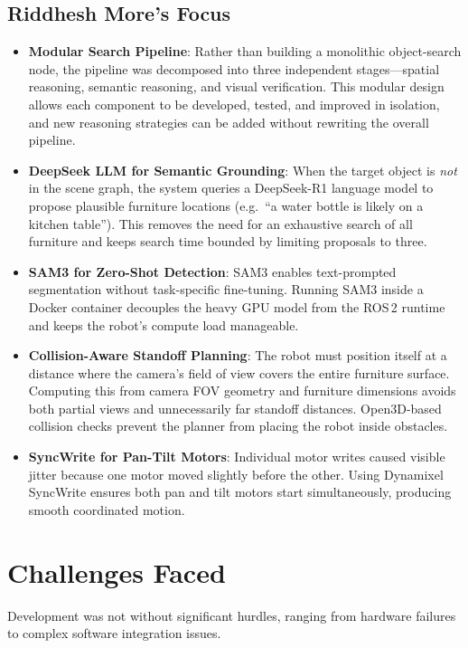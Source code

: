 \documentclass[12pt,oneside,a4paper]{article}
\begin{document}
\subsection{Riddhesh More's Focus}
\begin{itemize}
    \item \textbf{Modular Search Pipeline}: Rather than building a monolithic object-search node, the pipeline was decomposed into three independent stages---spatial reasoning, semantic reasoning, and visual verification. This modular design allows each component to be developed, tested, and improved in isolation, and new reasoning strategies can be added without rewriting the overall pipeline.
    \item \textbf{DeepSeek LLM for Semantic Grounding}: When the target object is \emph{not} in the scene graph, the system queries a DeepSeek-R1 language model to propose plausible furniture locations (e.g.\ ``a water bottle is likely on a kitchen table''). This removes the need for an exhaustive search of all furniture and keeps search time bounded by limiting proposals to three.
    \item \textbf{SAM3 for Zero-Shot Detection}: SAM3 enables text-prompted segmentation without task-specific fine-tuning. Running SAM3 inside a Docker container decouples the heavy GPU model from the ROS\,2 runtime and keeps the robot's compute load manageable.
    \item \textbf{Collision-Aware Standoff Planning}: The robot must position itself at a distance where the camera's field of view covers the entire furniture surface. Computing this from camera FOV geometry and furniture dimensions avoids both partial views and unnecessarily far standoff distances. Open3D-based collision checks prevent the planner from placing the robot inside obstacles.
    \item \textbf{SyncWrite for Pan-Tilt Motors}: Individual motor writes caused visible jitter because one motor moved slightly before the other. Using Dynamixel SyncWrite ensures both pan and tilt motors start simultaneously, producing smooth coordinated motion.
\end{itemize}

\section{Challenges Faced}
\label{sec:challenges}

Development was not without significant hurdles, ranging from hardware failures to complex software integration issues.
\end{document}
